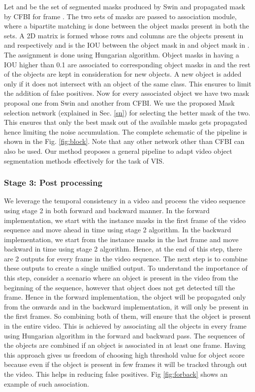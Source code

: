 \documentclass[final]{cvpr}
\begin{document}
Let   and   be the set of segmented masks produced by Swin and propagated mask by CFBI for frame . The two sets of masks are passed to association module, where a bipartite matching is done between the object masks present in both the sets. A 2D matrix is formed whose rows and columns are the objects present in  and   respectively and  is the IOU between the  object mask in  and  object mask in . The assignment is done using Hungarian algorithm. Object masks in  having a IOU higher than 0.1 are associated to corresponding object masks in  and the rest of the objects are kept in consideration for new objects. A new object is added only if it does not intersect with an object of the same class. This ensures to limit the addition of false positives. Now for every associated object we have two mask proposal one from Swin and another from CFBI. We use the proposed Mask selection network (explained in Sec. \ref{sn}) for selecting the better mask of the two. This ensures that only the best mask out of the available masks gets propagated hence limiting the noise accumulation. The complete schematic of the pipeline is shown in the Fig. \ref{fig:block}. Note that any other network other than CFBI can also be used. Our method proposes a general pipeline to adapt video object segmentation methods effectively for the task of VIS.

\subsubsection*{Stage 3: Post processing}

We leverage the temporal consistency in a video and process the video sequence using stage 2 in both forward and backward manner.
In the forward implementation, we start with the instance masks in the first frame of the video sequence and move ahead in time using stage 2 algorithm. In the backward implementation, we start from the instance masks in the last frame and move backward in time using stage 2 algorithm. 
Hence, at the end of this step, there are 2 outputs for every frame in the video sequence. The next step is to combine these outputs to create a single unified output. To understand the importance of this step, consider a scenario where an object is present in the video from the beginning of the sequence, however that object does not get detected till the  frame. Hence in the forward implementation, the object will be propagated only from the  onwards and in the backward implementation, it will only be present in the first  frames. So combining both of them, will ensure that the object is present in the entire video. This is achieved by associating all the objects in every frame using Hungarian algorithm in the forward and backward pass. The sequences of the objects are combined if an object is associated in at least one frame. Having this approach gives us freedom of choosing high threshold value for object score because even if the object is present in few frames it will be tracked through out the video. This helps in reducing false positives. Fig \ref{fig:forback} shows an example of such association.
 
\end{document}
